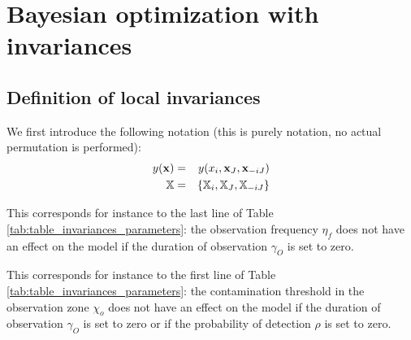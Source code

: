 \section{Bayesian optimization with invariances}\label{sec:warping}

\subsection{Definition of local invariances}
% 


We first introduce the following notation (this is purely notation, no actual permutation is performed):
\begin{eqnarray}
 y(\mathbf{x}) &=& y(x_i, \mathbf{x}_J, \mathbf{x}_{-iJ})\\
 \mathbb{X} &=& \{\mathbb{X}_i, \mathbb{X}_J, \mathbb{X}_{-iJ} \}
\end{eqnarray}

This corresponds for instance to the last line of Table \ref{tab:table_invariances_parameters}: the observation frequency $\eta_f$ does not have an effect on the model if the duration of observation $\gamma_O$ is set to zero.

This corresponds for instance to the first line of Table \ref{tab:table_invariances_parameters}: the contamination threshold in the observation zone $\chi_o$  
does not have an effect on the model if the duration of observation $\gamma_O$ is set to zero or if the probability of detection $\rho$ is set to zero.

